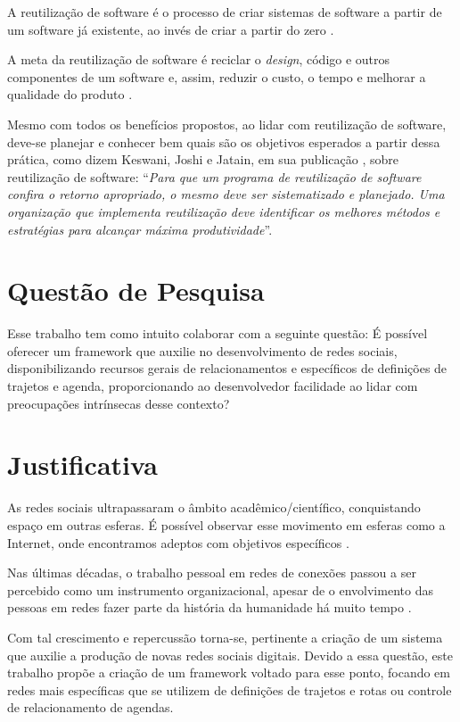 A reutilização de software é o processo de criar sistemas de software a partir de um software já existente, ao invés de criar a partir do zero \cite{Krueger:1992}.

A meta da reutilização de software é reciclar o \textit{design}, código e outros componentes de um software e, assim, reduzir o custo, o tempo e melhorar a qualidade do produto \cite{Keswani:Joshi:Jatain:2014}.

Mesmo com todos os benefícios propostos, ao lidar com reutilização de software, deve-se planejar e conhecer bem quais são os objetivos esperados a partir dessa prática, como dizem Keswani, Joshi e Jatain, em sua publicação  \cite{Keswani:Joshi:Jatain:2014}, sobre reutilização de software: ``\textit{Para que um programa de reutilização de software confira o retorno apropriado, o mesmo deve ser sistematizado e planejado. Uma organização que implementa reutilização deve identificar os melhores métodos e estratégias para alcançar máxima produtividade}''.

\section{Questão de Pesquisa}

Esse trabalho tem como intuito colaborar com a seguinte questão: É possível oferecer um framework que auxilie no desenvolvimento de redes sociais, disponibilizando recursos gerais de relacionamentos e específicos de definições de trajetos e agenda, proporcionando ao desenvolvedor facilidade ao lidar com preocupações intrínsecas desse contexto?

\section{Justificativa}

As redes sociais ultrapassaram o âmbito acadêmico/científico, conquistando espaço em outras esferas. É possível observar esse movimento em esferas como a Internet, onde encontramos adeptos com objetivos específicos \cite{Tomae:Alcara:Chiara:2005}.

Nas últimas décadas, o trabalho pessoal em redes de conexões passou a ser percebido como um instrumento organizacional, apesar de o envolvimento das pessoas em redes fazer parte da história da humanidade há muito tempo \cite{Tomae:Alcara:Chiara:2005}.

Com tal crescimento e repercussão torna-se, pertinente a criação de um sistema que auxilie a produção de novas redes sociais digitais. Devido a essa questão, este trabalho propõe a criação de um framework voltado para esse ponto, focando em redes mais específicas que se utilizem de definições de trajetos e rotas ou controle de relacionamento de agendas.

